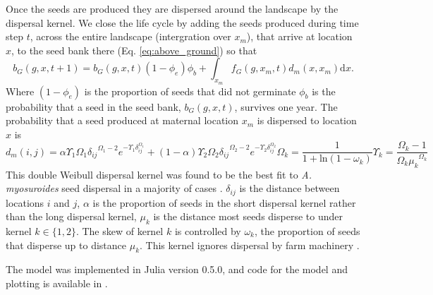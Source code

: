 \documentclass[10pt,letterpaper]{article}
\begin{document}
Once the seeds are produced they are dispersed around the landscape by the dispersal kernel. We close the life cycle by adding the seeds produced during time step $t$, across the entire landscape (intergration over $x_m$), that arrive at location $x$, to the seed bank there (Eq. \ref{eq:above_ground}) so that 
\begin{equation}
	b_G(g, x, t + 1) = b_G(g, x, t)(1 - \phi_e)\phi_b + \int_{x_m}f_G(g, x_m, t)d_m(x, x_m)\text{d}x.  
\end{equation}
Where $(1 - \phi_e)$ is the proportion of seeds that did not germinate $\phi_b$ is the probability that a seed in the seed bank, $b_G(g, x, t)$, survives one year. The probability that a seed produced at maternal location $x_m$ is dispersed to location $x$ is 
\begin{subequations}\label{eq:seed_disp}
\begin{equation}\label{eq:seed_kern}
	d_m(i, j) = {\alpha \Upsilon_1 \Omega_1 \delta_{ij}}^{\Omega_1 - 2} e^{-\Upsilon_1 \delta_{ij}^{\Omega_1}} + {(1 - \alpha) \Upsilon_2 \Omega_2 \delta_{ij}}^{\Omega_2 - 2} e^{-\Upsilon_2 \delta_{ij}^{\Omega_2}}  
\end{equation}
\begin{equation}\label{eq:shape}
	\Omega_k = \frac{1}{1 + \text{ln}(1 - \omega_k)}
\end{equation}
\begin{equation}\label{eq:scale}
	\Upsilon_k = \frac{\Omega_k - 1}{{\Omega_k \mu_k}^{\Omega_k}}
\end{equation}
\end{subequations} 
This double Weibull dispersal kernel was found to be the best fit to \textit{A. myosuroides} seed dispersal in a majority of cases \cite{Colb2001}. $\delta_{ij}$ is the distance between locations $i$ and $j$, $\alpha$ is the proportion of seeds in the short dispersal kernel rather than the long dispersal kernel, $\mu_k$ is the distance most seeds disperse to under kernel $k \in \{1, 2\}$. The skew of kernel $k$ is controlled by $\omega_k$, the proportion of seeds that disperse up to distance $\mu_k$. This kernel ignores dispersal by farm machinery \cite{Colb2001}.

The model was implemented in Julia version 0.5.0, and code for the model and plotting is available in .
\end{document}
